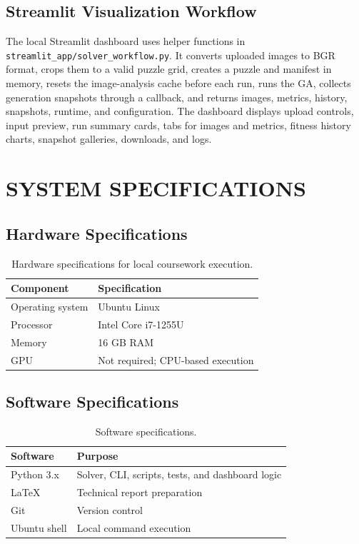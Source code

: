 \documentclass[12pt,a4paper]{article}
\begin{document}
\subsection{Streamlit Visualization Workflow}
The local Streamlit dashboard uses helper functions in \texttt{streamlit\_app/solver\_workflow.py}. It converts uploaded images to BGR format, crops them to a valid puzzle grid, creates a puzzle and manifest in memory, resets the image-analysis cache before each run, runs the GA, collects generation snapshots through a callback, and returns images, metrics, history, snapshots, runtime, and configuration. The dashboard displays upload controls, input preview, run summary cards, tabs for images and metrics, fitness history charts, snapshot galleries, downloads, and logs.

\section{SYSTEM SPECIFICATIONS}
\subsection{Hardware Specifications}
\begin{table}[H]
\centering
\begin{tabular}{ll}
\toprule
\textbf{Component} & \textbf{Specification} \\
\midrule
Operating system & Ubuntu Linux \\
Processor & Intel Core i7-1255U \\
Memory & 16 GB RAM \\
GPU & Not required; CPU-based execution \\
\bottomrule
\end{tabular}
\caption{Hardware specifications for local coursework execution.}
\end{table}

\subsection{Software Specifications}
\begin{table}[H]
\centering
\begin{tabular}{ll}
\toprule
\textbf{Software} & \textbf{Purpose} \\
\midrule
Python 3.x & Solver, CLI, scripts, tests, and dashboard logic \\
LaTeX & Technical report preparation \\
Git & Version control \\
Ubuntu shell & Local command execution \\
\bottomrule
\end{tabular}
\caption{Software specifications.}
\end{table}
\end{document}

